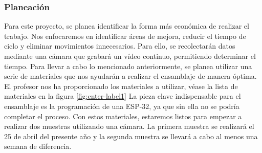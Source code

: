     \subsubsection{Planeación}
    Para este proyecto, se planea identificar la forma más económica de realizar el trabajo. Nos enfocaremos en identificar áreas de mejora, reducir el tiempo de ciclo y eliminar movimientos innecesarios. Para ello, se recolectarán datos mediante una cámara que grabará un vídeo continuo, permitiendo determinar el tiempo. 
    Para llevar a cabo lo mencionado anteriormente, se planea utilizar una serie de materiales que nos ayudarán a realizar el ensamblaje de manera óptima. El profesor nos ha proporcionado los materiales a utilizar, véase la lista de materiales en la figura \ref{fig:enter-label1}
    La pieza clave indispensable para el ensamblaje es la programación de una ESP-32, ya que sin ella no se podría completar el proceso. Con estos materiales, estaremos listos para empezar a realizar dos muestras utilizando una cámara. La primera muestra se realizará el 25 de abril del presente año y la segunda muestra se llevará a cabo al menos una semana de diferencia.
